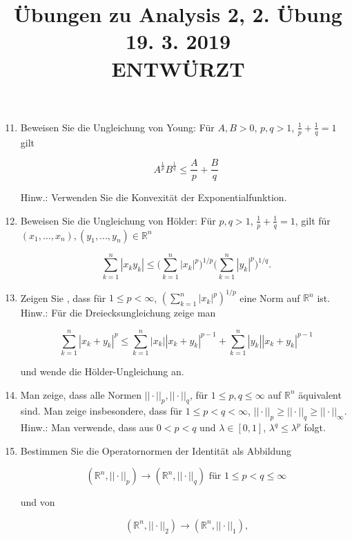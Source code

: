 \documentclass{article}
\title{
    \textbf{Übungen zu Analysis 2, 2. Übung 19. 3. 2019} \\
    \smaller ENTWÜRZT
}
\date{}
\begin{document}
\maketitle

\begin{enumerate}
\setcounter{enumi}{10}

\item Beweisen Sie die Ungleichung von Young: Für $A, B > 0$, $p, q > 1$, $\frac{1}{p} + \frac{1}{q} = 1$ gilt

\[
    A^{\frac{1}{p}} B^{\frac{1}{q}} \leq
    \frac{A}{p} + \frac{B}{q}
\]

Hinw.: Verwenden Sie die Konvexität der Exponentialfunktion.

\item Beweisen Sie die Ungleichung von Hölder: Für $p, q > 1$, $\frac{1}{p} + \frac{1}{q} = 1$, gilt für $(x_1, ..., x_n), (y_1, ..., y_n) \in \mathbb{R}^n
$

\[
    \sum_{k=1}^n |x_k y_k| \leq
    \Bigg( \sum_{k=1}^n |x_k|^p \Bigg)^{1/p}
    \Bigg( \sum_{k=1}^n |y_k|^p \Bigg)^{1/q}
    \text{.}
\]

\item Zeigen Sie , dass für $1 \leq p < \infty$, $( \sum\nolimits_{k=1}^n |x_k|^p )^{1/p}$ eine Norm auf $\mathbb{R}^n$ ist. \\
Hinw.: Für die Dreiecksungleichung zeige man

\[
    \sum_{k=1}^n |x_k + y_k|^p \leq
    \sum_{k=1}^n |x_k| |x_k + y_k|^{p-1} +
    \sum_{k=1}^n |y_k| |x_k + y_k|^{p-1}
\]

und wende die Hölder-Ungleichung an.

\item Man zeige, dass alle Normen $|| \cdot ||_p, || \cdot ||_q$, für $1 \leq p, q \leq \infty$ auf $\mathbb{R}^n$ äquivalent sind. Man zeige insbesondere, dass für $1 \leq p < q < \infty$, $|| \cdot ||_p \geq || \cdot ||_q \geq || \cdot ||_{\infty}$. \\
Hinw.: Man verwende, dass aus $0 < p < q$ und $\lambda \in [0, 1]$, $\lambda^q \leq \lambda^p$ folgt.

\item Bestimmen Sie die Operatornormen der Identität als Abbildung

\[
    (\mathbb{R}^n, || \cdot ||_p) \rightarrow (\mathbb{R}^n, || \cdot ||_q)
    \text{ für }
    1 \leq p < q \leq \infty
\]

und von

\[
    (\mathbb{R}^n, || \cdot ||_2) \rightarrow (\mathbb{R}^n, || \cdot ||_1)
    \text{,}
\]


\end{enumerate}
\end{document}
